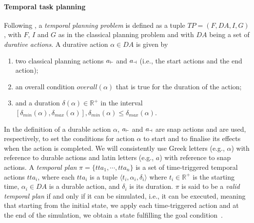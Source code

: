 \paragraph{Temporal task planning} 
\noindent Following \cite{DBLP:conf/ijcai/CushingKMW07,DBLP:journals/ai/ColesFHLS09,DBLP:journals/jair/ColesCFL12}, a \emph{temporal planning problem} is defined as a tuple $TP = (F, DA, I, G)$, with $F$, $I$ and $G$ as in the classical planning problem and with $DA$ being a set of \emph{durative actions}. A durative action $\alpha \in DA$ is given by
%
\begin{enumerate}[label=\roman*)]
    \item two classical planning actions $\aStart{a}$ and $\aEnd{a}$ (i.e., the start actions and the end action);
    \item an overall condition $overall(\alpha)$ that is true for the duration of the action;
    \item and a duration $\delta(\alpha)\in\mathbb{R}^+$ in the interval $[\delta_{min}(\alpha), \delta_{max}(\alpha)], \delta_{min}(\alpha) \le \delta_{max}(\alpha)$.
\end{enumerate}
%
In the definition of a durable action $\alpha$,  $\aStart{a}$ and $\aEnd{a}$ are snap actions and are used, respectively, to set the conditions for action $\alpha$ to start and to finalise its effects when the action is completed. We will consistently use Greek letters (e.g., $\alpha$) with reference to durable actions and latin letters (e.g., $a$) with reference to snap actions. 
A \emph{temporal plan} $\pi = \{tta_1, \cdots, tta_n\}$ is a set of time-triggered temporal actions $tta_i$, where each $tta_i$ is a tuple $\langle t_i, \alpha_i, \delta_i \rangle$ where $t_i \in \mathbb{R}^+$ is the starting time, $\alpha_i \in DA$ is a durable action, and $\delta_i$ is its duration.
%
$\pi$ is said to be a \emph{valid temporal plan} if and only if it can be simulated, i.e., it can be executed, meaning that starting from the initial state, we apply each time-triggered action and at the end of the simulation, we obtain a state fulfilling the goal condition~\cite{pddl31,DBLP:conf/aips/BentonCC12,DBLP:conf/ijcai/CushingKMW07,DBLP:journals/ai/ColesFHLS09,DBLP:journals/jair/ColesCFL12}. 
%


